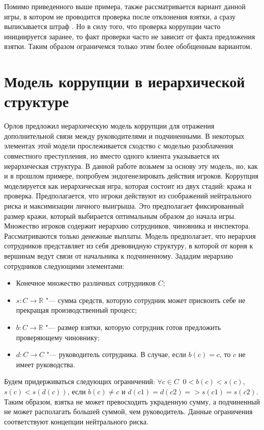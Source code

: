 \par
Помимо приведенного выше примера, также рассматривается вариант данной игры, в котором не проводится проверка после отклонения взятки, а сразу выписывается штраф \cite{Spengler}. Но в силу того, что проверка коррупции часто инициируется заранее, то факт проверки часто не зависит от факта предложения взятки. Таким образом ограничемся только этим более обобщенным вариантом.
\section{Модель коррупции в иерархической структуре}
Орлов\cite{Orlov} предложил иерархическую модель коррупции для отражения дополнительной связи между руководителями и подчиненными. В некоторых элементах этой модели прослеживается сходство с моделью разоблачения совместного преступления, но вместо одного клиента указывается их иерархическая структура. В данной работе возьмем за основу эту модель, но, как и в прошлом примере, попробуем эндогенезировать действия игроков.
Коррупция моделируется как иерархическая игра, которая состоит из двух стадий: кража и проверка. Предполагается, что игроки действуют из соображений нейтрального риска и максимизации личного выигрыша. Это предполагает фиксированный размер кражи, который выбирается оптимальным образом до начала игры. Множество игроков содержит иерархию сотрудников, чиновника и инспектора.  Рассматриваются только денежные выплаты. Модель предполагает, что иерархия сотрудников представляет из себя древовидную структуру, в которой от корня к вершинам ведут связи от начальника к подчиненному.
Зададим иерархию сотрудников следующими элементами:
\begin{itemize}
\item Конечное множество различных сотрудников $C$;
\item $s\colon C\to \mathbb{R}$ "--- сумма средств, которую сотрудник может присвоить себе не прекращая производственный процесс;
\item $b\colon C\to \mathbb{R}$ "--- размер взятки, которую сотрудник готов предложить проверяющему чиновнику;
\item $d\colon C\to C$ "--- руководитель сотрудника. В случае, если  $b(c) = c$, то $c$ не имеет руководства.
 
\end{itemize}
Будем придерживаться следующих ограничений: $\forall c \in C\;\;0 < b(c) < s(c)$, $s(c) < s(d(c))$, если $b(c) \neq c$ и $d(c1)=d(c2) =>s(c1)=s(c2)$. Таким образом, взятка не может превосходить украденную сумму, а подчиненный не может располагать большей суммой, чем руководитель. Данные ограничения соответствуют концепции нейтрального риска\cite{Orlov}.
